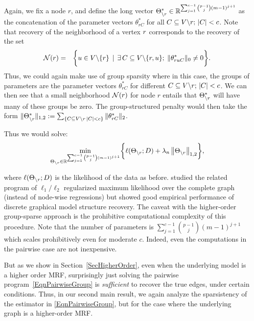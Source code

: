 Again, we fix a node $r$, and define the long vector $\Theta^*_{\backslash r} \in \mathbb{R}^{\sum_{j=1}^{c-1} \binom{p-1}{j} (m-1)^{j+1}}$ as the concatenation of the parameter vectors $\theta^*_{rC}$ for all $C \subseteq V \backslash r;\, |C| < c$. Note that recovery of the neighborhood of a vertex $r$ corresponds to the recovery of the set
\begin{eqnarray*}
\mathcal{N}(r) & = & \biggr \{ u \in V \backslash \{r\} \, \mid
\, \exists \, C \subseteq V \backslash \{r,u\} ;\; \|\theta^*_{r u C}\|_0 \neq 0 \biggr \}.
\end{eqnarray*}
Thus, we could again make use of group sparsity where in this case, the groups of parameters are the parameter vectors $\theta^*_{rC}$ for different $C \subseteq V \backslash r;\, |C| < c$. We can then see that a small neighborhood $\mathcal{N}(r)$ for node $r$ entails that $\Theta^*_{\backslash r}$ will have many of these groups be zero. The group-structured penalty would then take the form $\|\Theta^*_{\backslash r}\|_{1,2} := \sum_{\{C \subseteq  V \backslash r\, |C| < c\}} \|\theta^*_{rC}\|_{2}$.


Thus we would solve:
\begin{equation}
\label{EqnGroupHigherOrder}
\min_{\Theta_{\backslash r} \in \mathbb{R}^{\sum_{j=1}^{c-1} \binom{p-1}{j} (m-1)^{j+1}}} \biggr\{ \ell(\Theta_{\backslash r}; D) +
	\lambda_n \left\|\Theta_{\backslash r}\right\|_{1,2} \biggr\},
\end{equation}

where $\ell(\Theta_{\backslash r}; D)$ is the likelihood of the data as before. \citet{Dahinden07,Dahinden10} studied the related program of $\ell_1/\ell_2$ regularized maximum likelihood over the complete graph (instead of node-wise regressions) but showed good empirical performance of discrete graphical model structure recovery. The caveat with the higher-order group-sparse approach is the prohibitive computational complexity of this procedure. Note that the number of parameters is $\sum_{j=1}^{c-1} \binom{p-1}{j} (m-1)^{j+1}$ which scales prohibitively even for moderate $c$. Indeed, even the computations in the pairwise case are not inexpensive.

But as we show in Section~\ref{SecHigherOrder}, even when the underlying model is a higher order MRF, surprisingly just solving the pairwise program~\eqref{EqnPairwiseGroup} is \emph{sufficient} to recover the true edges, under certain conditions. Thus, in our second main result, we again analyze the sparsistency of the estimator in \eqref{EqnPairwiseGroup}, but for the case where the underlying graph is a higher-order MRF.



